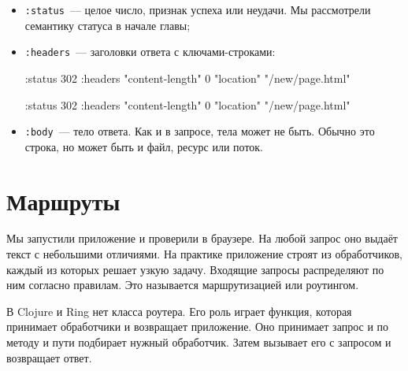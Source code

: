 \begin{itemize}

\item
  \verb|:status|~--- целое число, признак успеха или неудачи. Мы рассмотрели
  семантику статуса в начале главы;

\item
  \verb|:headers|~--- заголовки ответа с ключами-строками:


\ifx\DEVICETYPE\MOBILE

\begin{english}
  \begin{clojure}
{:status 302
 :headers
   {"content-length" 0
    "location" "/new/page.html"}}
  \end{clojure}
\end{english}

\else

\begin{english}
  \begin{clojure}
{:status 302
 :headers {"content-length" 0
           "location" "/new/page.html"}}
  \end{clojure}
\end{english}

\fi

\item
  \verb|:body|~--- тело ответа. Как и в запросе, тела может не быть. Обычно
  это строка, но может быть и файл, ресурс или поток.

\end{itemize}

\section{Маршруты}


Мы запустили приложение и проверили в браузере. На любой запрос оно выдаёт текст
с небольшими отличиями. На практике приложение строят из обработчиков, каждый из
которых решает узкую задачу. Входящие запросы распределяют по ним согласно
правилам. Это называется маршрутизацией или роутингом.

В Clojure и Ring нет класса роутера. Его роль играет функция, которая принимает
обработчики и возвращает приложение. Оно принимает запрос и по методу и пути
подбирает нужный обработчик. Затем вызывает его с запросом и возвращает ответ.


